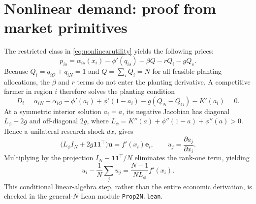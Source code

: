 \documentclass[11pt,a4paper]{article}
\begin{document}
\section{Nonlinear demand: proof from market primitives}
\label{app:nonlinearproof}
The restricted class in \eqref{eq:nonlinearutility} yields the following prices:
\begin{equation}
 p_{is}=\alpha_{is}(x_i)-\phi'(q_{is})-\beta Q-rQ_i-gQ_s.
 \label{eq:appprice}
\end{equation}
Because $Q_i=q_{iO}+q_{iN}=1$ and $Q=\sum_i Q_i=N$ for all feasible planting allocations, the $\beta$ and $r$ terms do not enter the planting derivative. A competitive farmer in region $i$ therefore solves the planting condition
\begin{equation}
D_i=\alpha_{iN}-\alpha_{iO}
 -\phi'(a_i)+\phi'(1-a_i)
 -g(Q_N-Q_O)-K'(a_i)=0.
\label{eq:appD}
\end{equation}
At a symmetric interior solution $a_i=a$, its negative Jacobian has diagonal $L_\phi+2g$ and off-diagonal $2g$, where $L_\phi=K''(a)+\phi''(1-a)+\phi''(a)>0$. Hence a unilateral research shock $dx_i$ gives
\begin{equation}
 \big(L_\phi I_N+2g\mathbf1\mathbf1^\top\big)\mathbf u
 =f'(x_i)\mathbf e_i,\qquad
 u_j=\frac{\partial a_j}{\partial x_i}.
 \label{eq:appJ}
\end{equation}
Multiplying by the projection $I_N-\mathbf1\mathbf1^\top/N$ eliminates the rank-one term, yielding
\begin{equation}
u_i-\frac1N\sum_j u_j
=\frac{N-1}{NL_\phi}f'(x_i).
\label{eq:appcontrast}
\end{equation}
This conditional linear-algebra step, rather than the entire economic derivation, is checked in the general-$N$ Lean module \texttt{Prop2N.lean}.
\end{document}
